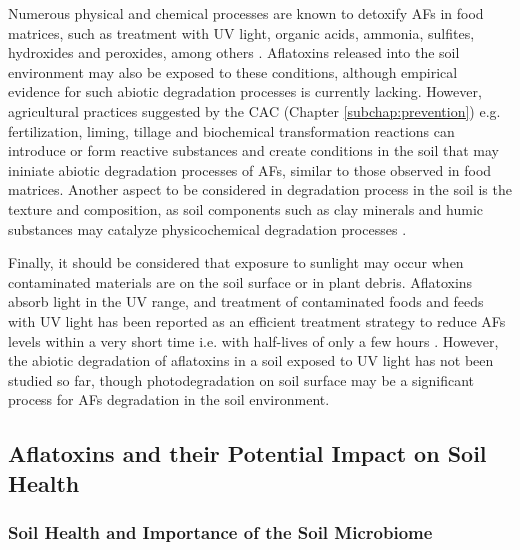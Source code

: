 Numerous physical and chemical processes are known to detoxify AFs in food matrices, such as treatment with UV light, organic acids, ammonia, sulfites, hydroxides and peroxides, among others \citep{pankaj2018review, piva1995detoxification, diao2015ultraviolet, peng2018current}. Aflatoxins released into the soil environment may also be exposed to these conditions, although empirical evidence for such abiotic degradation processes is currently lacking. However, agricultural practices suggested by the CAC (Chapter \ref{subchap:prevention}) e.g. fertilization, liming, tillage and biochemical transformation reactions can introduce or form reactive substances and create conditions in the soil that may ininiate abiotic degradation processes of AFs, similar to those observed in food matrices. Another aspect to be considered in degradation process in the soil is the texture and composition, as soil components such as clay minerals and humic substances may catalyze physicochemical degradation processes \citep{starr2017solvent,fripiat1974clays, birkel2002abiotic, garrido2010clays, wang2020transformation}. 

Finally, it should be considered that exposure to sunlight may occur when contaminated materials are on the soil surface or in plant debris. Aflatoxins absorb light in the UV range, and treatment of contaminated foods and feeds with UV light has been reported as an efficient treatment strategy to reduce AFs levels within a very short time i.e. with half-lives of only a few hours \citep{diao2015ultraviolet}. However, the abiotic degradation of aflatoxins in a soil exposed to UV light has not been studied so far, though photodegradation on soil surface may be a significant process for AFs degradation in the soil environment.


\subsection{Aflatoxins and their Potential Impact on Soil Health} \label{subchap:soilhealth}

\subsubsection*{Soil Health and Importance of the Soil Microbiome} \label{subsubchap:soilhealth_definitions}

